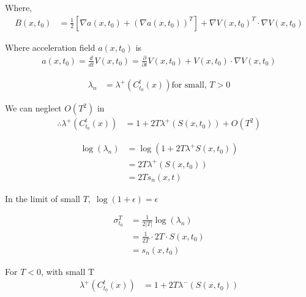 \documentclass[../report.tex]{subfiles}
\begin{document}
Where,
\begin{equation}
  \begin{aligned}
    B(x, t_0) &= \frac{1}{2}[\nabla a(x, t_0) + (\nabla a(x, t_0))^T] + \nabla V(x, t_0)^T \cdot \nabla V(x, t_0)
  \end{aligned}
\end{equation}

Where acceleration field \(a(x, t_0)\) is
\begin{equation}
  \begin{aligned}
    a(x, t_0) = \frac{d}{dt}V(x, t_0) = \frac{\partial}{\partial t} V(x, t_0) + V(x, t_0) \cdot \nabla V(x, t_0)
  \end{aligned}
\end{equation}

\begin{equation}
  \begin{aligned}
    \lambda_n &= \lambda^+ (C_{t_0}^t (x)) \text{for small, } T > 0
  \end{aligned}
\end{equation}

We can neglect \(O(T^2)\) in
\begin{equation}
  \begin{aligned}
    \therefore \lambda^+ (C_{t_0}^t (x)) &= 1 + 2T \lambda^+ (S(x, t_0)) + O(T^2)
  \end{aligned}
\end{equation}

\begin{equation}
  \begin{aligned}
    \log(\lambda_n) &= \log(1 + 2T\lambda^+S(x, t_0)) \\
    &= 2T\lambda^+(S(x, t_0)) \\
    &= 2Ts_n(x, t)
  \end{aligned}
\end{equation}

In the limit of small \(T,\; \log(1+\epsilon) = \epsilon\)

\begin{equation}
  \begin{aligned}
    \sigma_{t_0}^T &= \frac{1}{2|T|}\log(\lambda_n) \\
    &= \frac{1}{2T} \cdot 2T \cdot S(x, t_0) \\
    &= s_n(x, t_0)
  \end{aligned}
\end{equation}

For \(T < 0\), with small T
\begin{equation}
  \begin{aligned}
    \lambda^+ (C_{t_0}^t(x)) &= 1 + 2T \lambda^- (S(x, t_0))
  \end{aligned}
\end{equation}
\end{document}
